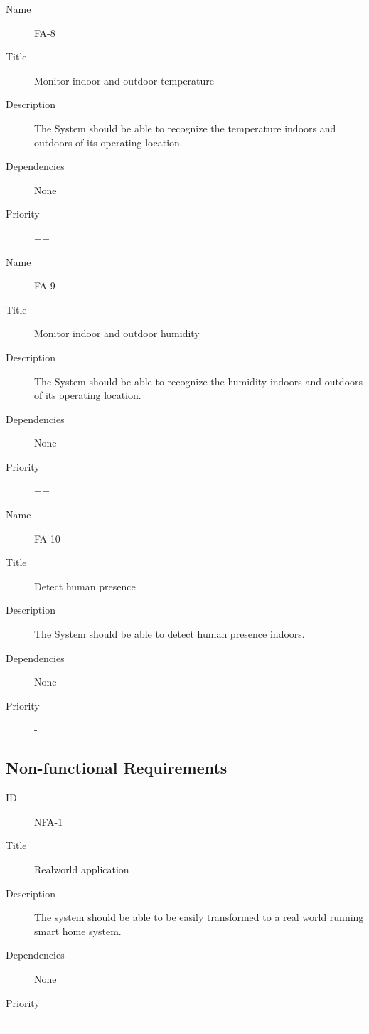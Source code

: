 \begin{description}
    \item[Name] FA-8
    \item[Title] Monitor indoor and outdoor temperature
    \item[Description] The System should be able to recognize the temperature indoors and outdoors of its operating location.
    \item[Dependencies] None
    \item[Priority] ++
\end{description}

\begin{description}
    \item[Name] FA-9
    \item[Title] Monitor indoor and outdoor humidity
    \item[Description] The System should be able to recognize the humidity indoors and outdoors of its operating location.
    \item[Dependencies] None
    \item[Priority] ++
\end{description}

\begin{description}
    \item[Name] FA-10
    \item[Title] Detect human presence
    \item[Description] The System should be able to detect human presence indoors.
    \item[Dependencies] None
    \item[Priority] -
\end{description}

\subsection{Non-functional Requirements}

\begin{description}
    \item[ID] NFA-1
    \item[Title] Realworld application
    \item[Description] The system should be able to be easily transformed to a real world running smart home system.
    \item[Dependencies] None
    \item[Priority] -
\end{description}

